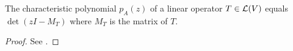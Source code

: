 \begin{thm}
  \label{thm:characterPolyDeterminant}
  The characteristic polynomial $p_A(z)$
  of a linear operator $T\in{\cal L}(V)$
  equals $\det(zI-M_T)$
  where $M_T$ is the matrix of $T$. 
\end{thm}
\begin{proof}
  See \cite[p. 309]{axler15:_linear_algeb_done_right}.
\end{proof}



